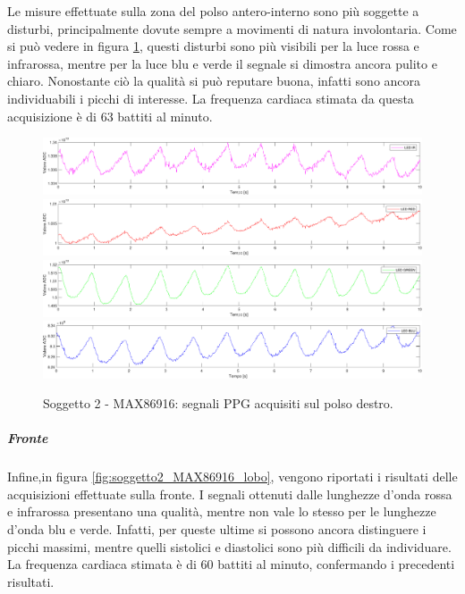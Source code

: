 Le misure effettuate sulla zona del polso antero-interno sono più soggette a disturbi, principalmente dovute sempre a movimenti di natura involontaria. Come si può vedere in figura \ref{fig:soggetto2_MAX86916_polso}, questi disturbi sono più visibili per la luce rossa e infrarossa, mentre per la luce blu e verde il segnale si dimostra ancora pulito e chiaro. Nonostante ciò la qualità si può reputare buona, infatti sono ancora individuabili i picchi di interesse. La frequenza cardiaca stimata da questa acquisizione è di 63 battiti al minuto.
\begin{figure}[h]
	\centering
	\includegraphics[width=1\linewidth]{ImageFiles/Misure Preliminari/Soggetto 2/max86916/polso_inferiore_ired}
	\includegraphics[width=1\linewidth]{ImageFiles/Misure Preliminari/Soggetto 2/max86916/polso_inferiore_red}
	\includegraphics[width=1\linewidth]{ImageFiles/Misure Preliminari/Soggetto 2/max86916/polso_inferiore_green}
	\includegraphics[width=1\linewidth]{ImageFiles/Misure Preliminari/Soggetto 2/max86916/polso_inferiore_blu}
	\caption{Soggetto 2 - MAX86916: segnali PPG acquisiti sul polso destro.}
	\label{fig:soggetto2_MAX86916_polso}
\end{figure}

\subparagraph{Fronte}

Infine,in figura \ref{fig:soggetto2_MAX86916_lobo}, vengono riportati i risultati delle acquisizioni effettuate sulla fronte. I segnali ottenuti dalle lunghezze d'onda rossa e infrarossa presentano una qualità, mentre non vale lo stesso per le lunghezze d'onda blu e verde. Infatti, per queste ultime si possono ancora distinguere i picchi massimi, mentre quelli sistolici e diastolici sono più difficili da individuare. La frequenza cardiaca stimata è di 60 battiti al minuto, confermando i precedenti risultati.

